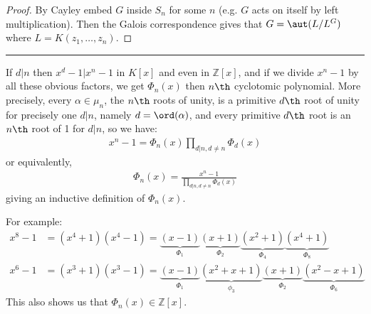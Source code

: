\documentclass[a4paper, 10pt, twocolumn]{amsart}
\begin{document}
\begin{proof}
By Cayley embed $G$ inside $S_n$ for some $n$ (e.g. $G$ acts on itself by left multiplication). Then the Galois correspondence gives that $G = \aut (L/L^G)$ where $L = K(z_1, \ldots, z_n)$.
\end{proof}
\hrule
If $d|n$ then $x^d-1 | x^n-1$ in $K[x]$ and even in $\mathbb{Z}[x]$, and if we divide $x^n-1$ by all these obvious factors, we get $\Phi_n(x)$ then $n\th$ cyclotomic polynomial. More precisely, every $\alpha \in \mu_n$, the $n\th$ roots of unity, is a primitive $d\th$ root of unity for precisely one $d|n$, namely $d = \ord(\alpha)$, and every primitive $d\th$ root is an $n\th$ root of 1 for $d|n$, so we have:
\begin{align*}
x^n-1 = \Phi_n(x) \prod_{d|n, d\neq n} \Phi_d(x)
\end{align*}
or equivalently,
\begin{align*}
\Phi_n(x) = \frac{x^n-1}{\prod_{d|n, d\neq n}\Phi_d(x)}
\end{align*}
giving an inductive definition of $\Phi_n(x)$.

For example:
\begin{align*}
x^8-1 &= (x^4+1)(x^4-1) = \underbrace{(x-1)}_{\Phi_1}\underbrace{(x+1)}_{\Phi_2}\underbrace{(x^2+1)}_{\Phi_4}\underbrace{(x^4+1)}_{\Phi_8}\\
x^6-1 &= (x^3+1)(x^3-1) = \underbrace{(x-1)}_{\Phi_1}\underbrace{(x^2+x+1)}_{\phi_3}\underbrace{(x+1)}_{\Phi_2}\underbrace{(x^2-x+1)}_{\Phi_6}
\end{align*}
This also shows us that $\Phi_n(x) \in \mathbb{Z}[x]$.
\end{document}
